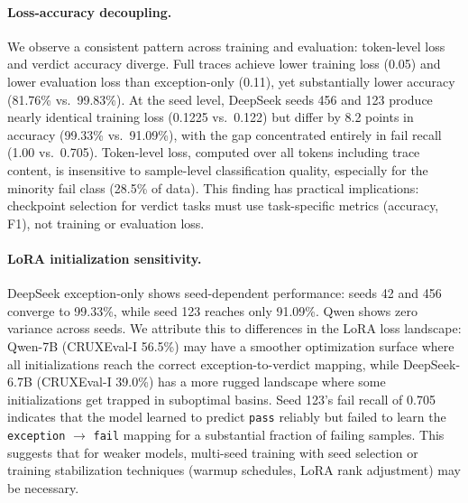 \documentclass[11pt]{article}
\begin{document}
\paragraph{Loss-accuracy decoupling.}
We observe a consistent pattern across training and evaluation: token-level loss and verdict accuracy diverge. Full traces achieve lower training loss (0.05) and lower evaluation loss than exception-only (0.11), yet substantially lower accuracy (81.76\% vs.\ 99.83\%). At the seed level, DeepSeek seeds 456 and 123 produce nearly identical training loss (0.1225 vs.\ 0.122) but differ by 8.2 points in accuracy (99.33\% vs.\ 91.09\%), with the gap concentrated entirely in fail recall (1.00 vs.\ 0.705). Token-level loss, computed over all tokens including trace content, is insensitive to sample-level classification quality, especially for the minority fail class (28.5\% of data). This finding has practical implications: checkpoint selection for verdict tasks must use task-specific metrics (accuracy, F1), not training or evaluation loss.

\paragraph{LoRA initialization sensitivity.}
DeepSeek exception-only shows seed-dependent performance: seeds 42 and 456 converge to 99.33\%, while seed 123 reaches only 91.09\%. Qwen shows zero variance across seeds. We attribute this to differences in the LoRA loss landscape: Qwen-7B (CRUXEval-I 56.5\%) may have a smoother optimization surface where all initializations reach the correct exception-to-verdict mapping, while DeepSeek-6.7B (CRUXEval-I 39.0\%) has a more rugged landscape where some initializations get trapped in suboptimal basins. Seed 123's fail recall of 0.705 indicates that the model learned to predict \texttt{pass} reliably but failed to learn the \texttt{exception} $\to$ \texttt{fail} mapping for a substantial fraction of failing samples. This suggests that for weaker models, multi-seed training with seed selection or training stabilization techniques (warmup schedules, LoRA rank adjustment) may be necessary.
\end{document}
